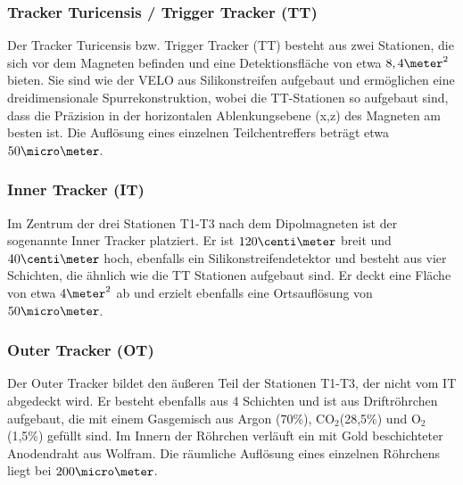 \subsubsection{Tracker Turicensis / Trigger Tracker (TT)}
Der Tracker Turicensis bzw. Trigger Tracker (TT) besteht aus zwei Stationen, die sich vor dem Magneten befinden und eine Detektionsfläche von etwa $8,4\meter^2$ bieten. Sie sind wie der VELO aus Silikonstreifen aufgebaut und ermöglichen eine dreidimensionale Spurrekonstruktion, wobei die TT-Stationen so aufgebaut sind, dass die Präzision in der horizontalen Ablenkungsebene (x,z) des Magneten am besten ist. Die Auflösung eines einzelnen Teilchentreffers beträgt etwa $50\micro\meter$.

\subsubsection{Inner Tracker (IT)}
Im Zentrum der drei Stationen T1-T3 nach dem Dipolmagneten ist der sogenannte Inner Tracker platziert. Er ist $120\centi\meter$ breit und $40\centi\meter$ hoch, ebenfalls ein Silikonstreifendetektor und besteht aus vier Schichten, die ähnlich wie die TT Stationen aufgebaut sind. Er deckt eine Fläche von etwa $4\meter^2$ ab und erzielt ebenfalls eine Ortsauflösung von $50\micro\meter$.

\subsubsection{Outer Tracker (OT)}
Der Outer Tracker bildet den äußeren Teil der Stationen T1-T3, der nicht vom IT abgedeckt wird. Er besteht ebenfalls aus 4 Schichten und ist aus Driftröhrchen aufgebaut, die mit einem Gasgemisch aus Argon (70\%), CO$_2$(28,5\%) und O$_2$ (1,5\%) gefüllt sind. Im Innern der Röhrchen verläuft ein mit Gold beschichteter Anodendraht aus Wolfram. Die räumliche Auflösung eines einzelnen Röhrchens liegt bei $200\micro\meter$.

